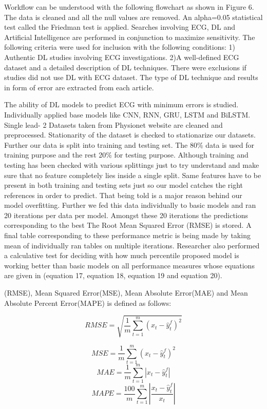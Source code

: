 \documentclass[a4paper, fleqn]{cas-sc}
\begin{document}
Workflow can be understood with the following flowchart as shown in Figure 6. The data is cleaned and all the null values are removed. An alpha=0.05 statistical test called the Friedman test is applied. Searches involving ECG,  DL and Artificial Intelligence are performed in conjunction to maximize sensitivity. The following criteria were used for inclusion with the following conditions: 1) Authentic DL studies involving ECG investigations. 2)A well-defined ECG dataset and a detailed description of DL techniques. There were exclusions if studies did not use DL with ECG dataset. The type of DL technique and results in form of error are extracted from each article.


The ability of DL models to predict ECG with minimum errors is studied. Individually applied base models like CNN, RNN, GRU, LSTM and BiLSTM. Single lead- 2  Datasets taken from Physionet website are cleaned and preprocessed. Stationarity of the dataset is checked to stationarize our datasets. Further our data is split into training and testing set. The 80\% data is used for training purpose and the rest 20\% for testing purpose. Although training and testing has been checked with various splittings just to try understand and make sure that no feature completely lies inside a single split. Same features have to be present in both training and testing sets just so our model catches the right references in order to predict. That being told is a major reason behind our model overfitting.
Further we fed this data individually to basic models and ran 20 iterations per data per model. Amongst these 20 iterations the predictions corresponding to the best The Root Mean Squared Error (RMSE) is stored. A final table corresponding to these performance metric is being made by taking mean of individually ran tables on multiple iterations. Researcher also performed a calculative test for deciding with how much percentile  proposed model is working better than basic models on all performance measures whose equations are given in (equation 17, equation 18, equation 19 and equation 20).


(RMSE),  Mean Squared Error(MSE),  Mean Absolute Error(MAE) and Mean Absolute Percent Error(MAPE) is defined as follows:

\begin{equation}
  {RMSE} = \sqrt{\frac{1}{m}\sum_{t=1}^{m}(x_t - \hat{y}_{t}^f)^2}
\end{equation}

\begin{equation}
  {MSE} = \frac{1}{m} \sum_{t=1}^{m} (x_t - \hat{y}_{t}^f)^2
\end{equation}
\begin{equation}
  {MAE} = \frac{1}{m} \sum_{t=1}^{m} \left|x_t - \hat{y}_{t}^f\right|
\end{equation}
\begin{equation}
  {MAPE} =\frac{100}{m} \sum_{t=1}^{m} \left| \frac{x_t - \hat{y}_{t}^f}{x_t} \right|
\end{equation}
\end{document}

